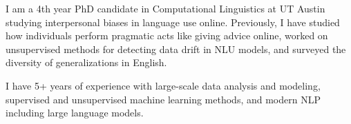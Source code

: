 I am a 4th year PhD candidate in Computational Linguistics at UT Austin studying interpersonal biases in language use online. Previously, I have studied how individuals perform pragmatic acts like giving advice online, worked on unsupervised methods for detecting data drift in NLU models, and surveyed the diversity of generalizations in English.

\vspace{0.1em}

\noindent I have 5+ years of experience with large-scale data analysis and modeling, supervised and unsupervised machine learning methods, and modern NLP  including large language models.
